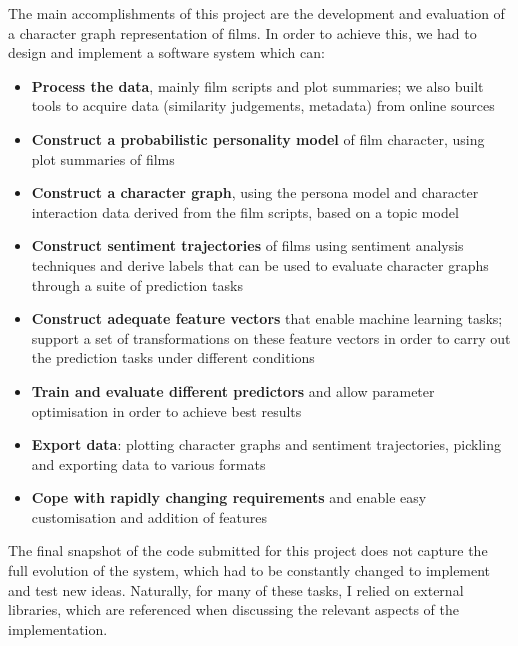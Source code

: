 \documentclass[bsc,frontabs,deptreport,singlespacing,parskip, twoside]{infthesis}
\begin{document}
The main accomplishments of this project are the development and evaluation of a character graph representation of films. In order to achieve this, we had to design and implement a software system which can:
\begin{itemize}
	\item \textbf{Process the data}, mainly film scripts and plot summaries; we also built tools to acquire data (similarity judgements, metadata) from online sources
	\item \textbf{Construct a probabilistic personality model} of film character, using plot summaries of films
	\item \textbf{Construct a character graph}, using the persona model and character interaction data derived from the film scripts, based on a topic model
	\item \textbf{Construct sentiment trajectories} of films using sentiment analysis techniques and derive labels that can be used to evaluate character graphs through a suite of prediction tasks
	\item \textbf{Construct adequate feature vectors} that enable machine learning tasks; support a set of transformations on these feature vectors in order to carry out the prediction tasks under different conditions
	\item \textbf{Train and evaluate different predictors} and allow parameter optimisation in order to achieve best results
	\item \textbf{Export data}: plotting character graphs and sentiment trajectories, pickling and exporting data to various formats
	\item \textbf{Cope with rapidly changing requirements} and enable easy customisation and addition of features
\end{itemize}

The final snapshot of the code submitted for this project does not capture the full evolution of the system, which had to be constantly changed to implement and test new ideas. Naturally, for many of these tasks, I relied on external libraries, which are referenced when discussing the relevant aspects of the implementation.
\end{document}
